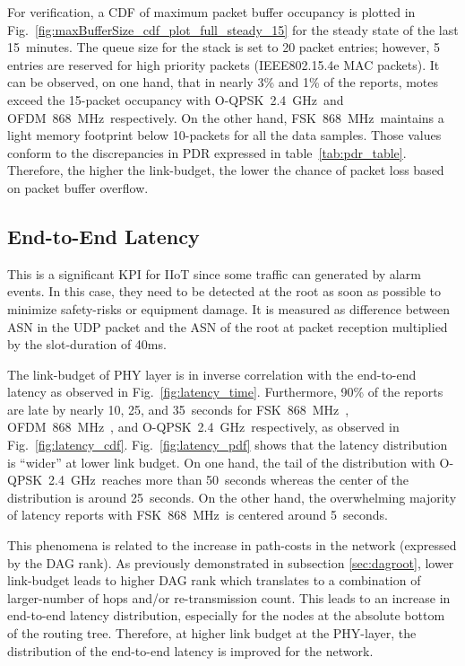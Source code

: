 \documentclass[sensors,article,submit,moreauthors,pdftex]{Definitions/mdpi}
\newcommand{\fsk}          {FSK~868~MHz}
\newcommand{\oqpsk}        {O-QPSK~2.4~GHz}
\newcommand{\ofdm}         {OFDM~868~MHz}
\begin{document}

For verification, a CDF of maximum packet buffer occupancy is plotted in Fig.~\ref{fig:maxBufferSize_cdf_plot_full_steady_15} for the steady state of the last 15~minutes. 
The queue size for the stack is set to 20 packet entries; however, 5 entries are reserved for high priority packets (IEEE802.15.4e MAC packets).
It can be observed, on one hand, that in nearly 3\% and 1\% of the reports, motes exceed the 15-packet occupancy with \oqpsk\ and \ofdm\ respectively.
On the other hand, \fsk\ maintains a light memory footprint below 10-packets for all the data samples. 
Those values conform to the discrepancies in PDR expressed in table~\ref{tab:pdr_table}. 
Therefore, the higher the link-budget, the lower the chance of packet loss based on packet buffer overflow. 

\subsection{End-to-End Latency}
\label{sec:latency}


This is a significant KPI for IIoT since some traffic can generated by alarm events.
In this case, they need to be detected at the root as soon as possible to minimize safety-risks or equipment damage.
It is measured as difference between ASN in the UDP packet and the ASN of the root at packet reception multiplied by the slot-duration of 40ms.


The link-budget of PHY layer is in inverse correlation with the end-to-end latency as observed in Fig.~\ref{fig:latency_time}.
Furthermore, 90\% of the reports are late by nearly 10, 25, and 35~seconds for \fsk\ , \ofdm\ , and \oqpsk\ respectively, as observed in Fig.~\ref{fig:latency_cdf}.
Fig.~\ref{fig:latency_pdf} shows that the latency distribution is ``wider'' at lower link budget.
On one hand, the tail of the distribution with \oqpsk\  reaches more than 50~seconds whereas the center of the distribution is around 25~seconds.
On the other hand, the overwhelming majority of latency reports with \fsk\ is centered around 5~seconds.


This phenomena is related to the increase in path-costs in the network (expressed by the DAG rank).
As previously demonstrated in subsection \ref{sec:dagroot}, lower link-budget leads to higher DAG rank which translates to a combination of larger-number of hops and/or re-transmission count.
This leads to an increase in end-to-end latency distribution, especially for the nodes at the absolute bottom of the routing tree. 
Therefore, at higher link budget at the PHY-layer, the distribution of the end-to-end latency is improved for the network.
\end{document}
